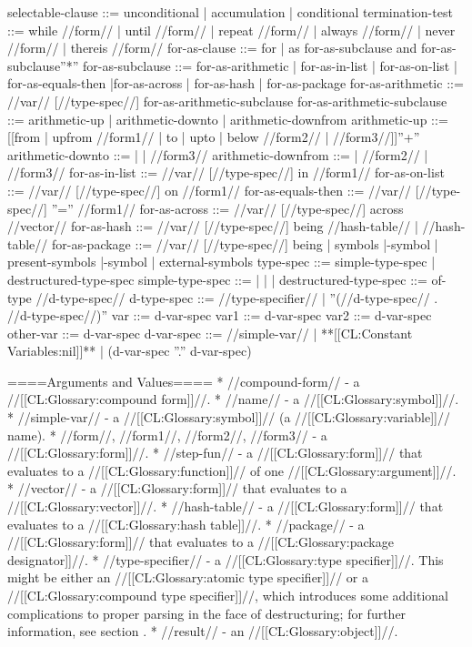 selectable-clause ::= unconditional | accumulation | conditional
termination-test ::= while //form// | until //form// | repeat //form// | always //form// | never //form// | thereis //form//
for-as-clause ::= {for | as} for-as-subclause {and for-as-subclause}''*''
for-as-subclause ::= for-as-arithmetic | for-as-in-list | for-as-on-list | for-as-equals-then |for-as-across | for-as-hash | for-as-package
for-as-arithmetic ::= //var// [//type-spec//] for-as-arithmetic-subclause
for-as-arithmetic-subclause ::= arithmetic-up | arithmetic-downto | arithmetic-downfrom
arithmetic-up ::= [[{from | upfrom} //form1// | {to | upto | below} //form2// |  //form3//]]''+''
arithmetic-downto ::=  |  |  //form3//
arithmetic-downfrom ::=  |  //form2// |  //form3//
for-as-in-list ::= //var// [//type-spec//] in //form1// 
for-as-on-list ::= //var// [//type-spec//] on //form1// 
for-as-equals-then ::= //var// [//type-spec//] ''='' //form1// 
for-as-across ::= //var// [//type-spec//] across //vector//
for-as-hash ::= //var// [//type-spec//] being  \lcurly{}  //hash-table// \xcurly{} | \xcurly{}  //hash-table// \xcurly{}\rcurly
for-as-package ::= //var// [//type-spec//] being  \lcurlysymbol | symbols |\xcurlypresent-symbol | present-symbols |\xcurlyexternal-symbol | external-symbols\rcurly {}
type-spec ::= simple-type-spec | destructured-type-spec
simple-type-spec ::=  |  |  | 
destructured-type-spec ::= of-type //d-type-spec//
d-type-spec ::= //type-specifier// | ''(//d-type-spec// . //d-type-spec//)''
var ::= d-var-spec
var1 ::= d-var-spec
var2 ::= d-var-spec
other-var ::= d-var-spec
d-var-spec ::= //simple-var// | **[[CL:Constant Variables:nil]]** | (d-var-spec ''.'' d-var-spec)

====Arguments and Values====
  * //compound-form// - a //[[CL:Glossary:compound form]]//.
  * //name// - a //[[CL:Glossary:symbol]]//.
  * //simple-var// - a //[[CL:Glossary:symbol]]// (a //[[CL:Glossary:variable]]// name).
  * //form//, //form1//, //form2//, //form3// - a //[[CL:Glossary:form]]//.
  * //step-fun// - a //[[CL:Glossary:form]]// that evaluates to a //[[CL:Glossary:function]]// of one //[[CL:Glossary:argument]]//.
  * //vector// - a //[[CL:Glossary:form]]// that evaluates to a //[[CL:Glossary:vector]]//.
  * //hash-table// - a //[[CL:Glossary:form]]// that evaluates to a //[[CL:Glossary:hash table]]//.
  * //package// - a //[[CL:Glossary:form]]// that evaluates to a //[[CL:Glossary:package designator]]//.
  * //type-specifier// - a //[[CL:Glossary:type specifier]]//. This might be either an //[[CL:Glossary:atomic type specifier]]// or a //[[CL:Glossary:compound type specifier]]//, which introduces some additional complications to proper parsing in the face of destructuring; for further information, see section {\secref\DestructuringLOOPVars}.
  * //result// - an //[[CL:Glossary:object]]//.

